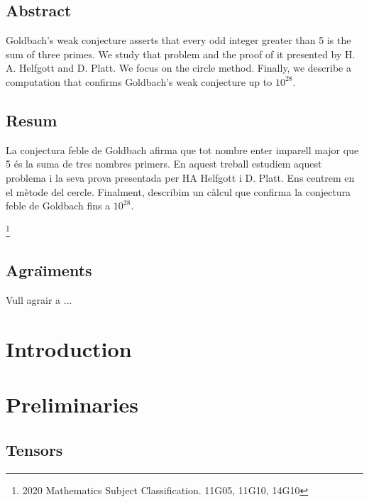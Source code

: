 \documentclass[11pt,a4paper,openright,oneside]{book}
\numberwithin{equation}{section}
\begin{document}
\newpage
{} 

\section*{Abstract}

Goldbach's weak conjecture asserts that every odd integer greater than 5 is the sum of three primes. We study that problem and the proof of it presented by H. A. Helfgott and D. Platt. We focus on the circle method. Finally, we describe a computation that confirms Goldbach's weak conjecture up to $10^{28}$.

\section*{Resum}
La conjectura feble de Goldbach afirma que tot nombre enter imparell major que 5 \'es la suma de tres nombres primers. En aquest treball estudiem aquest problema i la seva prova presentada per HA Helfgott i D. Platt. Ens centrem en el m\`etode del cercle. Finalment, describim un c\`alcul que confirma la conjectura feble de Goldbach fins a $10^{28}$.



{\let\thefootnote\relax\footnote{2020 Mathematics Subject Classification. 11G05, 11G10, 14G10}}



\newpage 


\section*{Agra\"{\i}ments}

Vull agrair a ... 
\newpage

\tableofcontents

\newpage

\setcounter{page}{1}
\chapter{Introduction}


\newpage

\chapter{Preliminaries}

\section{Tensors}
\end{document}
